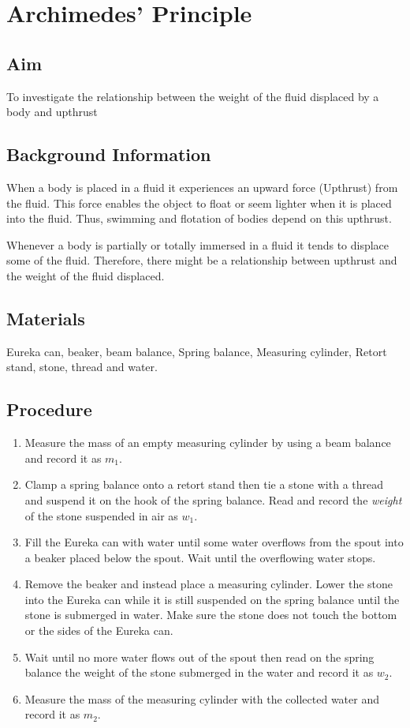 \chapter{Archimedes' Principle}

\section{Aim}
To investigate the relationship between the weight of the fluid displaced by a body and upthrust

\section{Background Information}
When a body is placed in a fluid it experiences an upward force (Upthrust) from the fluid. This force enables the object to float or seem lighter when it is placed into the fluid. Thus, swimming and flotation of bodies depend on this upthrust. 

Whenever a body is partially or totally immersed in a fluid it tends to displace some of the fluid. Therefore, there might be a relationship between upthrust and the weight of the fluid displaced. 

\section{Materials}
Eureka can, beaker, beam balance, Spring balance, Measuring cylinder, Retort stand, stone, thread and water.

\section{Procedure}
\begin{enumerate}
\item Measure the mass of an empty measuring cylinder by using a beam balance and record it as $m_1$.
\item Clamp a spring balance onto a retort stand then tie a stone with a thread and suspend it on the hook of the spring balance. Read and record the \textit{weight} of the stone suspended in air as $w_1$.
\item Fill the Eureka can with water until some water overflows from the spout into a beaker placed below the spout. Wait until the overflowing water stops.  
\item  Remove the beaker and instead place a measuring cylinder. Lower the stone into the Eureka can while it is still suspended on the spring balance until the stone is submerged in water. Make sure the stone does not touch the bottom or the sides of the Eureka can.  
\item Wait until no more water flows out of the spout then read on the spring balance the weight of the stone submerged in the water and record it as $w_2$.
\item Measure the mass of the measuring cylinder with the collected water and record it as $m_2$.
\end{enumerate}

